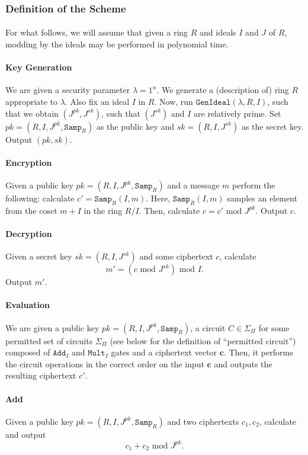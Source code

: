 \documentclass{article}
\theoremstyle{definition}
\theoremstyle{example}
\renewcommand{\mod}{\,\,\text{mod}\,\,}
\newcommand{\Add}{\texttt{Add}}
\newcommand{\Mult}{\texttt{Mult}}
\newcommand{\GenIdeal}{\texttt{GenIdeal}}
\newcommand{\Samp}{\texttt{Samp}}
\renewcommand{\vec}[1]{\mathbf{#1}}
\begin{document}
\subsubsection{Definition of the Scheme}
\paragraph{} For what follows, we will assume that given a ring $R$ and ideals
$I$ and $J$ of $R$, modding by the ideals may be performed in polynomial time.
\paragraph{Key Generation} We are given a security parameter $\lambda = 1^n$. We
generate a (description of) ring $R$ appropriate to $\lambda$. Also fix an ideal
$I$ in $R$. Now, run $\GenIdeal(\lambda, R, I)$, such that we obtain $(J^{pk},
J^{sk})$, such that $(J^{sk})$ and $I$ are relatively prime. Set $pk = (R, I,
J^{pk}, \Samp_R)$ as the public key and $sk = (R, I, J^{sk})$ as the secret key.
Output $(pk, sk)$.
\paragraph{Encryption} Given a public key $pk = (R, I, J^{pk}, \Samp_R)$ and a
message $m$ perform the following: calculate $c' = \Samp_R(I, m)$. Here,
$\Samp_R(I, m)$ samples an element from the coset $m + I$ in the ring $R/I$.
Then, calculate $c = c' \mod J^{pk}$. Output $c$.
\paragraph{Decryption} Given a secret key $sk = (R, I, J^{sk})$ and some
ciphertext $c$, calculate
\[
  m' = (c \mod J^{sk}) \mod I.
\]
Output $m'$.
\paragraph{Evaluation} We are given a public key $pk = (R, I, J^{pk}, \Samp_R)$, a
circuit $C \in \Sigma_\Pi$ for some permitted set of circuits $\Sigma_\Pi$ (see
below for the definition of ``permitted circuit'') composed of $\Add_I$ and $\Mult_I$ gates and a ciphertext vector
$\vec{c}$. Then, it performs the circuit operations in the correct order on the
input $\vec{c}$ and outputs the resulting ciphertext $c'$.
\paragraph{Add} Given a public key $pk = (R, I, J^{pk}, \Samp_R)$ and two
ciphertexts $c_1, c_2$, calculate and output
\[
  c_1 + c_2 \mod J^{pk}.
\]
\end{document}

